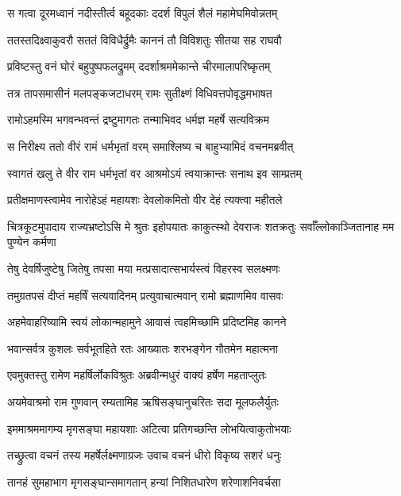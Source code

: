 \twolineshloka
{स गत्वा दूरमध्वानं नदीस्तीर्त्व बहूदकाः}
{ददर्श विपुलं शैलं महामेघमिवोन्नतम्} %

\twolineshloka
{ततस्तदिक्ष्वाकुवरौ सततं विविधैर्द्रुमैः}
{काननं तौ विविशतुः सीतया सह राघवौ} %

\twolineshloka
{प्रविष्टस्तु वनं घोरं बहुपुष्पफलद्रुमम्}
{ददर्शाश्रममेकान्ते चीरमालापरिष्कृतम्} %

\twolineshloka
{तत्र तापसमासीनं मलपङ्कजटाधरम्}
{रामः सुतीक्ष्णं विधिवत्तपोवृद्धमभाषत} %

\twolineshloka
{रामोऽहमस्मि भगवन्भवन्तं द्रष्टुमागतः}
{तन्माभिवद धर्मज्ञ महर्षे सत्यविक्रम} %

\twolineshloka
{स निरीक्ष्य ततो वीरं रामं धर्मभृतां वरम्}
{समाश्लिष्य च बाहुभ्यामिदं वचनमब्रवीत्} %

\twolineshloka
{स्वागतं खलु ते वीर राम धर्मभृतां वर}
{आश्रमोऽयं त्वयाक्रान्तः सनाथ इव साम्प्रतम्} %

\twolineshloka
{प्रतीक्षमाणस्त्वामेव नारोहेऽहं महायशः}
{देवलोकमितो वीर देहं त्यक्त्वा महीतले} %

\threelineshloka
{चित्रकूटमुपादाय राज्यभ्रष्टोऽसि मे श्रुतः}
{इहोपयातः काकुत्स्थो देवराजः शतक्रतुः}
{सर्वाँल्लोकाञ्जितानाह मम पुण्येन कर्मणा} %

\twolineshloka
{तेषु देवर्षिजुष्टेषु जितेषु तपसा मया}
{मत्प्रसादात्सभार्यस्त्वं विहरस्व सलक्ष्मणः} %

\twolineshloka
{तमुग्रतपसं दीप्तं महर्षिं सत्यवादिनम्}
{प्रत्युवाचात्मवान् रामो ब्रह्माणमिव वासवः} %

\twolineshloka
{अहमेवाहरिष्यामि स्वयं लोकान्महामुने}
{आवासं त्वहमिच्छामि प्रदिष्टमिह कानने} %

\twolineshloka
{भवान्सर्वत्र कुशलः सर्वभूतहिते रतः}
{आख्यातः शरभङ्गेन गौतमेन महात्मना} %

\twolineshloka
{एवमुक्तस्तु रामेण महर्षिर्लोकविश्रुतः}
{अब्रवीन्मधुरं वाक्यं हर्षेण महताप्लुतः} %

\twolineshloka
{अयमेवाश्रमो राम गुणवान् रम्यतामिह}
{ऋषिसङ्घानुचरितः सदा मूलफलैर्युतः} %

\twolineshloka
{इममाश्रममागम्य मृगसङ्घा महायशाः}
{अटित्वा प्रतिगच्छन्ति लोभयित्वाकुतोभयाः} %

\twolineshloka
{तच्छ्रुत्वा वचनं तस्य महर्षेर्लक्ष्मणाग्रजः}
{उवाच वचनं धीरो विकृष्य सशरं धनुः} %

\twolineshloka
{तानहं सुमहाभाग मृगसङ्घान्समागतान्}
{हन्यां निशितधारेण शरेणाशनिवर्चसा} %

